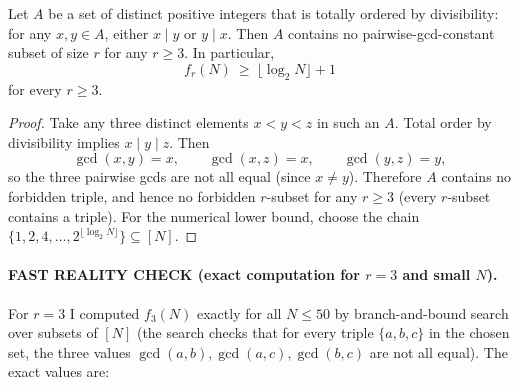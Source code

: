 \begin{lemma}\label{lem:535-chain}
Let $A$ be a set of distinct positive integers that is totally ordered by divisibility: for any $x,y\in A$, either $x\mid y$ or $y\mid x$. Then $A$ contains no pairwise-gcd-constant subset of size $r$ for any $r\ge 3$. In particular,
\[
f_r(N)\ \ge\ \big\lfloor \log_2 N\big\rfloor+1
\]
for every $r\ge 3$.
\end{lemma}
\begin{proof}
Take any three distinct elements $x<y<z$ in such an $A$. Total order by divisibility implies $x\mid y\mid z$. Then
\[
\gcd(x,y)=x,\qquad \gcd(x,z)=x,\qquad \gcd(y,z)=y,
\]
so the three pairwise gcds are not all equal (since $x\ne y$). Therefore $A$ contains no forbidden triple, and hence no forbidden $r$-subset for any $r\ge 3$ (every $r$-subset contains a triple). For the numerical lower bound, choose the chain $\{1,2,4,\dots,2^{\lfloor \log_2 N\rfloor}\}\subseteq [N]$.
\end{proof}

\paragraph{FAST REALITY CHECK (exact computation for $r=3$ and small $N$).}
For $r=3$ I computed $f_3(N)$ exactly for all $N\le 50$ by branch-and-bound search over subsets of $[N]$ (the search checks that for every triple $\{a,b,c\}$ in the chosen set, the three values $\gcd(a,b),\gcd(a,c),\gcd(b,c)$ are not all equal). The exact values are:

